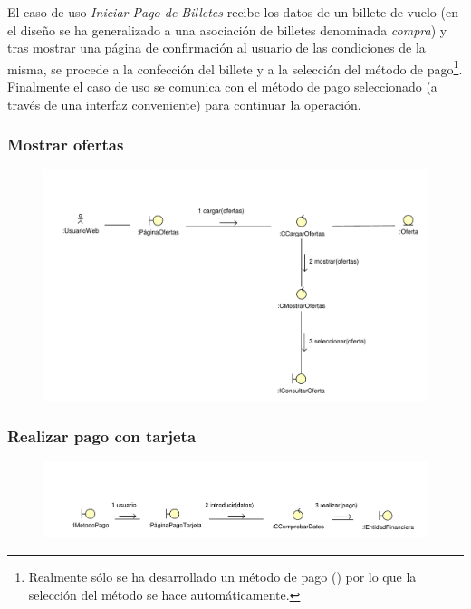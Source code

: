 \documentclass[11pt, a4paper, twoside, titlepage]{article}
\begin{document}
					El caso de uso {\itshape Iniciar Pago de Billetes} recibe los datos de un billete de vuelo (en el diseño se ha generalizado a una asociación de billetes denominada {\itshape compra}) y tras mostrar una página de confirmación al usuario de las condiciones de la misma, se procede a la confección del billete y a la selección del método de pago\footnote{Realmente sólo se ha desarrollado un método de pago () por lo que la selección del método se hace automáticamente.}. Finalmente el caso de uso se comunica con el método de pago seleccionado (a través de una interfaz conveniente) para continuar la operación.

			\subsubsection{Mostrar ofertas}
				\begin{figure}[H]\centering
					\includegraphics[scale=.72]{diagramas/mostrarofertas.pdf}
				\end{figure}

			\subsubsection{Realizar pago con tarjeta} \label{ana:tarjeta}
				\begin{figure}[H]\centering
					\includegraphics[scale=.7]{diagramas/pagotarjeta.pdf}
				\end{figure}
\end{document}
